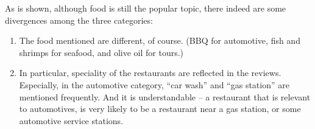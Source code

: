 \documentclass[11pt]{article}
\begin{document}
As is shown, although food is still the popular topic, there indeed are some divergences among the three categories:
\begin{enumerate}
  \item The food mentioned are different, of course. (BBQ for automotive, fish and shrimps for seafood, and olive oil for tours.)
  \item In particular, speciality of the restaurants are reflected in the reviews. Especially, in the automotive category, ``car wash'' and ``gas station'' are mentioned frequently. And it is understandable -- a restaurant that is relevant to automotives, is very likely to be a restaurant near a gas station, or some automotive service stations.
\end{enumerate}
\end{document}
